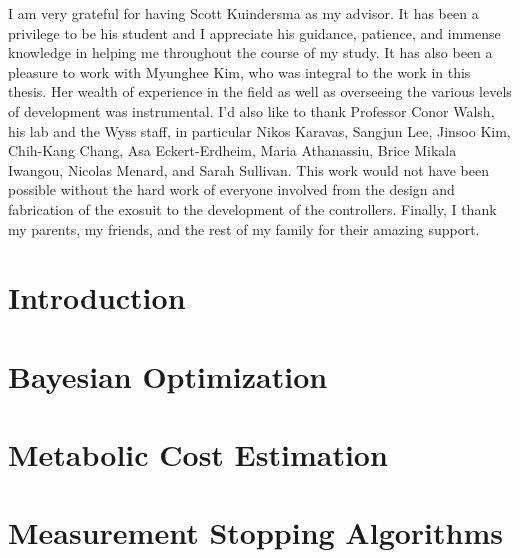 \documentclass[11pt]{gsasthesis} %
\begin{document}
\listoftables
\listoffigures
\listofalgorithms
\begin{acknowledgments}
  I am very grateful for having Scott Kuindersma as my advisor. It has been a privilege to be his student and I appreciate his guidance, patience, and immense knowledge in helping me throughout the course of my study. It has also been a pleasure to work with Myunghee Kim, who was integral to the work in this thesis. Her wealth of experience in the field as well as overseeing the various levels of development was instrumental. I'd also like to thank Professor Conor Walsh, his lab and the Wyss staff, in particular Nikos Karavas, Sangjun Lee, Jinsoo Kim, Chih-Kang Chang, Asa Eckert-Erdheim, Maria Athanassiu, Brice Mikala Iwangou, Nicolas Menard, and Sarah Sullivan. This work would not have been possible without the hard work of everyone involved from the design and fabrication of the exosuit to the development of the controllers. Finally, I thank my parents, my friends, and the rest of my family for their amazing support.
\end{acknowledgments}



\chapter*{Introduction}\label{ch:intro}


\chapter{Bayesian Optimization}\label{ch:1}


\chapter{Metabolic Cost Estimation}\label{ch:2}


\chapter{Measurement Stopping Algorithms}\label{ch:3}

\end{document}
